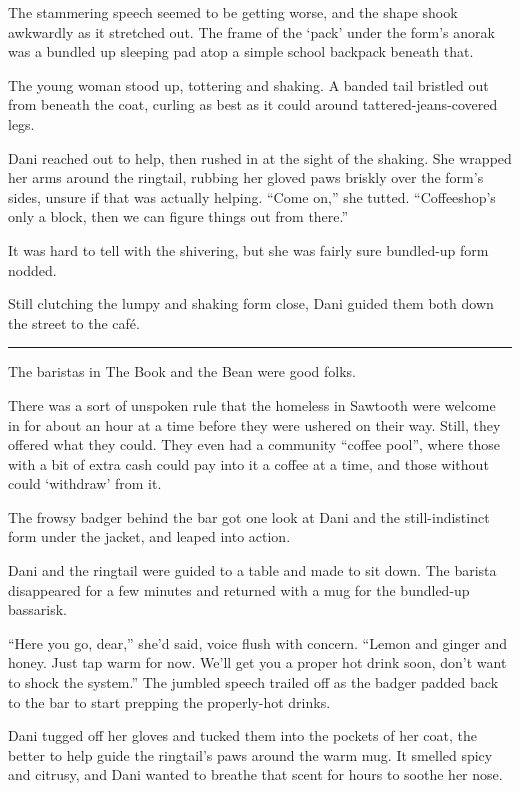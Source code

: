 The stammering speech seemed to be getting worse, and the shape shook awkwardly as it stretched out. The frame of the `pack' under the form's anorak was a bundled up sleeping pad atop a simple school backpack beneath that.

The young woman stood up, tottering and shaking. A banded tail bristled out from beneath the coat, curling as best as it could around tattered-jeans-covered legs.

Dani reached out to help, then rushed in at the sight of the shaking. She wrapped her arms around the ringtail, rubbing her gloved paws briskly over the form's sides, unsure if that was actually helping. ``Come on,'' she tutted. ``Coffeeshop's only a block, then we can figure things out from there.''

It was hard to tell with the shivering, but she was fairly sure bundled-up form nodded.

Still clutching the lumpy and shaking form close, Dani guided them both down the street to the café.

\begin{center}\rule{0.5\linewidth}{\linethickness}\end{center}

The baristas in The Book and the Bean were good folks.

There was a sort of unspoken rule that the homeless in Sawtooth were welcome in for about an hour at a time before they were ushered on their way. Still, they offered what they could. They even had a community ``coffee pool'', where those with a bit of extra cash could pay into it a coffee at a time, and those without could `withdraw' from it.

The frowsy badger behind the bar got one look at Dani and the still-indistinct form under the jacket, and leaped into action.

Dani and the ringtail were guided to a table and made to sit down. The barista disappeared for a few minutes and returned with a mug for the bundled-up bassarisk.

``Here you go, dear,'' she'd said, voice flush with concern. ``Lemon and ginger and honey. Just tap warm for now. We'll get you a proper hot drink soon, don't want to shock the system.'' The jumbled speech trailed off as the badger padded back to the bar to start prepping the properly-hot drinks.

Dani tugged off her gloves and tucked them into the pockets of her coat, the better to help guide the ringtail's paws around the warm mug. It smelled spicy and citrusy, and Dani wanted to breathe that scent for hours to soothe her nose.

